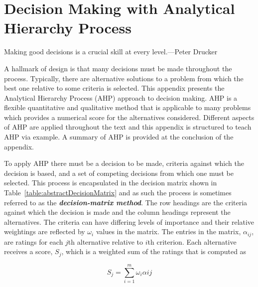 \chapter{Decision Making with Analytical Hierarchy Process}
\label{appendix:DecisionMakingAHP}
\graphicspath{ {./appendixB/Fig} }

\begin{itquote}
Making good decisions is a crucial skill at every level.---Peter Drucker
\end{itquote}

A hallmark of design is that many decisions must be made throughout the
process. Typically, there are alternative solutions to a problem from
which the best one relative to some criteria is selected. This appendix
presents the Analytical Hierarchy Process (AHP) approach to decision
making. AHP is a flexible quantitative and qualitative method that is
applicable to many problems which provides a numerical score for the
alternatives considered. Different aspects of AHP are applied throughout
the text and this appendix is structured to teach AHP via example. A
summary of AHP is provided at the conclusion of the appendix.

To apply AHP there must be a decision to be made, criteria against which
the decision is based, and a set of competing decisions from which one
must be selected. This process is encapsulated in the decision matrix
shown in Table~\ref{table:abstractDecisionMatrix} and as such the process is sometimes referred to as
the \emph{\textbf{decision-matrix method}}. The row headings are the
criteria against which the decision is made and the column headings
represent the alternatives. The criteria can have differing levels of
importance and their relative weightings are reflected by
$\omega_{i}$ values in the matrix. The entries
in the matrix, $\alpha_{ij}$, are ratings for each $j$th alternative relative to
$i$th criterion. Each alternative receives a score, $S_{j}$, which is a weighted sum of the ratings
that is computed as

\begin{equation}
\label{equ:decisionMatrix}
S_{j} = \sum_{i=1}^{m} \omega_{i}\alpha{ij}
\end{equation}


